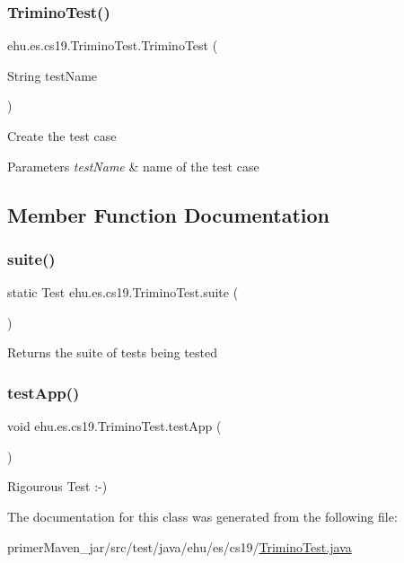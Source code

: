 \subsubsection{\texorpdfstring{TriminoTest()}{TriminoTest()}}
{\footnotesize\ttfamily ehu.\+es.\+cs19.\+Trimino\+Test.\+Trimino\+Test (\begin{DoxyParamCaption}\item[{String}]{test\+Name }\end{DoxyParamCaption})}

Create the test case


\begin{DoxyParams}{Parameters}
{\em test\+Name} & name of the test case \\
\hline
\end{DoxyParams}


\subsection{Member Function Documentation}
\mbox{\label{classehu_1_1es_1_1cs19_1_1_trimino_test_a5fa898ccd2031e659b10ae19317c15a5}} 
\subsubsection{\texorpdfstring{suite()}{suite()}}
{\footnotesize\ttfamily static Test ehu.\+es.\+cs19.\+Trimino\+Test.\+suite (\begin{DoxyParamCaption}{ }\end{DoxyParamCaption})\hspace{0.3cm}{\ttfamily [static]}}

\begin{DoxyReturn}{Returns}
the suite of tests being tested 
\end{DoxyReturn}
\mbox{\label{classehu_1_1es_1_1cs19_1_1_trimino_test_ad203e30535b73e709d8cf66d6bf10150}} 
\subsubsection{\texorpdfstring{testApp()}{testApp()}}
{\footnotesize\ttfamily void ehu.\+es.\+cs19.\+Trimino\+Test.\+test\+App (\begin{DoxyParamCaption}{ }\end{DoxyParamCaption})}

Rigourous Test \+:-\/) 

The documentation for this class was generated from the following file\+:\begin{DoxyCompactItemize}
\item 
primer\+Maven\+\_\+jar/src/test/java/ehu/es/cs19/\mbox{\hyperlink{_trimino_test_8java}{Trimino\+Test.\+java}}\end{DoxyCompactItemize}
